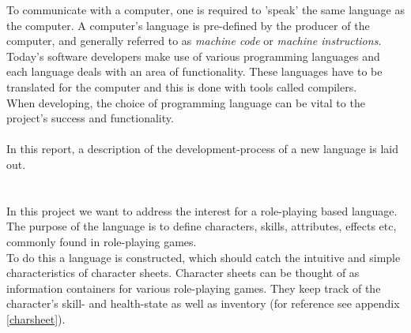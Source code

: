 
To communicate with a computer, one is required to 'speak' the same language as the computer. A computer's language is pre-defined by the producer of the computer, and generally referred to as \emph{machine code} or \emph{machine instructions}.\\
Today's software developers make use of various programming languages and each language deals with an area of functionality. These languages have to be translated for the computer and this is done with tools called compilers.\\
When developing, the choice of programming language can be vital to the project's success and functionality.\\\\
In this report, a description of the development-process of a new language is laid out.

\section{\langname{}}
In this project we want to address the interest for a role-playing based language. The purpose of the language is to define characters, skills, attributes, effects etc, commonly found in role-playing games.\\
To do this a language is constructed, which should catch the intuitive and simple characteristics of character sheets. Character sheets can be thought of as information containers for various role-playing games. They keep track of the character's skill- and health-state as well as inventory (for reference see appendix \vref{charsheet}).

